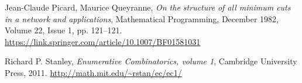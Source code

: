 \documentclass[numbers=enddot,12pt,final,onecolumn,notitlepage]{scrartcl}%
\theoremstyle{definition}
\begin{document}
\begin{thebibliography}{99999999}
Jean-Claude Picard, Maurice Queyranne,
\textit{On the structure of all minimum cuts in a network and applications},
Mathematical Programming,
December 1982, Volume 22, Issue 1, pp. 121--121.
\newline\url{https://link.springer.com/article/10.1007/BF01581031}

Richard P. Stanley, \textit{Enumerative
Combinatorics, volume 1}, Cambridge University Press, 2011. \newline%
\url{http://math.mit.edu/~rstan/ec/ec1/}

\end{thebibliography}
\end{document}
